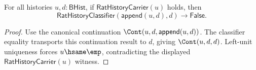 \begin{theorem}
\label{thm:rat-history-classifier-append-left-carrier-absurd}
For all histories $u,d:\mathsf{BHist}$, if $\mathsf{RatHistoryCarrier}(u)$
holds, then
$$
\mathsf{RatHistoryClassifier}(\mathsf{append}(u,d),d)
\to \mathsf{False}.
$$
\end{theorem}
\begin{proof}
Use the canonical continuation
$\Cont(u,d,\mathsf{append}(u,d))$. The classifier equality transports this
continuation result to $d$, giving $\Cont(u,d,d)$. Left-unit uniqueness forces
$u\hsame\emp$, contradicting the displayed
$\mathsf{RatHistoryCarrier}(u)$ witness.
\end{proof}

